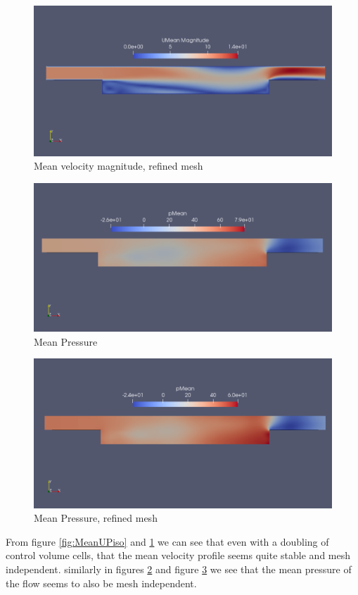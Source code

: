 \documentclass[paper=a4, fontsize=11pt]{article} %
\numberwithin{equation}{section} %
\numberwithin{figure}{section} %
\numberwithin{table}{section} %
\begin{document}
    \begin{figure}[h!]
        \centering
        \includegraphics[width=0.6\linewidth]{Figures/piso_refined_U_mean}
        \caption{Mean velocity magnitude, refined mesh}
        \label{fig:MeanUPisoRef}
    \end{figure}

    \begin{figure}[h!]
        \centering
        \includegraphics[width=0.6\linewidth]{Figures/piso_P_mean}
        \caption{Mean Pressure}
        \label{fig:MeanPPiso}
    \end{figure}

    \begin{figure}[h!]
        \centering
        \includegraphics[width=0.6\linewidth]{Figures/piso_refined_P_mean}
        \caption{Mean Pressure, refined mesh}
        \label{fig:MeanPPisoRef}
    \end{figure}

    From figure \ref{fig:MeanUPiso} and \ref{fig:MeanUPisoRef} we can see that even with a doubling of control volume cells, that the mean velocity profile seems quite stable and mesh independent. similarly  in figures \ref{fig:MeanPPiso} and figure \ref{fig:MeanPPisoRef} we see that the mean pressure of the flow seems to also be mesh independent. 
    
\end{document}
